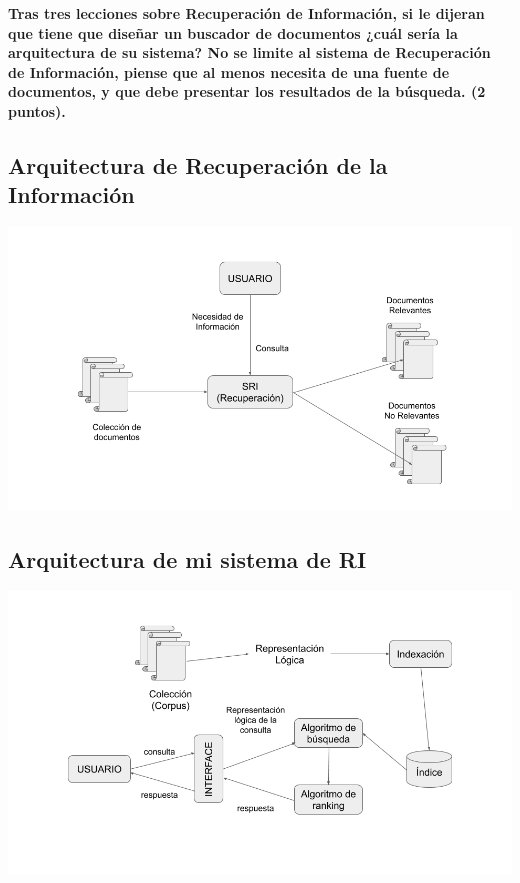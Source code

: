 \documentclass[11pt]{exam}
\begin{document}
\begin{questions}
{\bf \question Tras tres lecciones sobre Recuperación de Información, si le dijeran que tiene que diseñar un buscador de documentos ¿cuál sería la arquitectura de su sistema? No se limite al sistema de Recuperación de Información, piense que al menos necesita de una fuente de documentos, y que debe presentar los resultados de la búsqueda. (2 puntos).}

\subsection*{Arquitectura de Recuperación de la Información}

\begin{center}
	\includegraphics[scale=0.45]{general.png}
\end{center}

\subsection*{Arquitectura de mi sistema de RI}

\begin{center}
	\includegraphics[scale=0.45]{sistema.png}
\end{center}


\end{questions}
\end{document}
